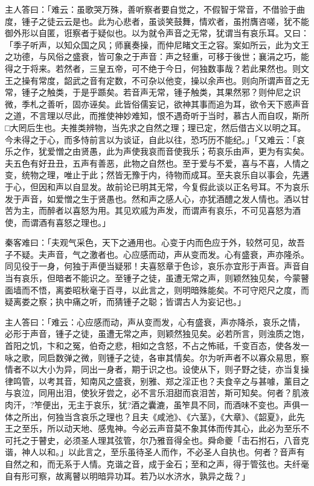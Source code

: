 \documentclass[UTF8,titlepage,oneside]{ctexbook}
\begin{document}
主人答曰：「难云：虽歌哭万殊，善听察者要自觉之，不假智于常音，不借验于曲度，锺子之徒云云是也。此为心悲者，虽谈笑鼓舞，情欢者，虽拊膺咨嗟，犹不能御外形以自匿，诳察者于疑似也。以为就令声音之无常，犹谓当有哀乐耳。又曰：「季子听声，以知众国之风；师襄奏操，而仲尼睹文王之容。案如所云，此为文王之功德，与风俗之盛衰，皆可象之于声音：声之轻重，可移于後世；襄涓之巧，能得之于将来。若然者，三皇五帝，可不绝于今日，何独数事哉？若此果然也。则文王之操有常度，韶武之音有定数，不可杂以他变，操以余声也。则向所谓声音之无常，锺子之触类，于是乎踬矣。若音声无常，锺子触类，其果然邪？则仲尼之识微，季札之善听，固亦诬矣。此皆俗儒妄记，欲神其事而追为耳，欲令天下惑声音之道，不言理以尽此，而推使神妙难知，恨不遇奇听于当时，慕古人而自叹，斯所□大罔后生也。夫推类辨物，当先求之自然之理；理已定，然后借古义以明之耳。今未得之于心，而多恃前言以为谈证，自此以往，恐巧历不能纪。」「又难云：「哀乐之作，犹爱憎之由贤愚，此为声使我哀而音使我乐；苟哀乐由声，更为有实矣。夫五色有好丑丑，五声有善恶，此物之自然也。至于爱与不爱，喜与不喜，人情之变，统物之理，唯止于此；然皆无豫于内，待物而成耳。至夫哀乐自以事会，先遘于心，但因和声以自显发。故前论已明其无常，今复假此谈以正名号耳。不为哀乐发于声音，如爱憎之生于贤愚也。然和声之感人心，亦犹酒醴之发人情也。酒以甘苦为主，而醉者以喜怒为用。其见欢戚为声发，而谓声有哀乐，不可见喜怒为酒使，而谓酒有喜怒之理也。」


秦客难曰：「夫观气采色，天下之通用也。心变于内而色应于外，较然可见，故吾子不疑。夫声音，气之激者也。心应感而动，声从变而发。心有盛衰，声亦隆杀。同见役于一身，何独于声便当疑邪！夫喜怒章于色诊，哀乐亦宜形于声音。声音自当有哀乐，但暗者不能识之。至锺子之徒，虽遭无常之声，则颖然独见矣，今蒙瞽面墙而不悟，离娄昭秋毫于百寻，以此言之，则明暗殊能矣。不可守咫尺之度，而疑离娄之察；执中痛之听，而猜锺子之聪；皆谓古人为妄记也。」


主人答曰：「难云：心应感而动，声从变而发，心有盛衰，声亦降杀，哀乐之情，必形于声音，锺子之徒，虽遭无常之声，则颖然独见矣。必若所言，则浊质之饱，首阳之饥，卞和之冤，伯奇之悲，相如之含怒，不占之怖祗，千变百态，使各发一咏之歌，同启数弹之微，则锺子之徒，各审其情矣。尔为听声者不以寡众易思，察情者不以大小为异，同出一身者，期于识之也。设使从下，则子野之徒，亦当复操律鸣管，以考其音，知南风之盛衰，别雅、郑之淫正也？夫食辛之与甚噱，薰目之与哀泣，同用出泪，使狄牙尝之，必不言乐泪甜而哀泪苦，斯可知矣。何者？肌液肉汗，?笮便出，无主于哀乐，犹?酒之囊漉，虽笮具不同，而酒味不变也。声俱一体之所出，何独当含哀乐之理也？且夫《咸池》、《六茎》，《大章》、《韶夏》，此先王之至乐，所以动天地、感鬼神。今必云声音莫不象其体而传其心，此必为至乐不可托之于瞽史，必须圣人理其弦管，尔乃雅音得全也。舜命夔「击石拊石，八音克谐，神人以和。」以此言之，至乐虽待圣人而作，不必圣人自执也。何者？音声有自然之和，而无系于人情。克谐之音，成于金石；至和之声，得于管弦也。夫纤毫自有形可察，故离瞽以明暗异功耳。若乃以水济水，孰异之哉？」
\end{document}
